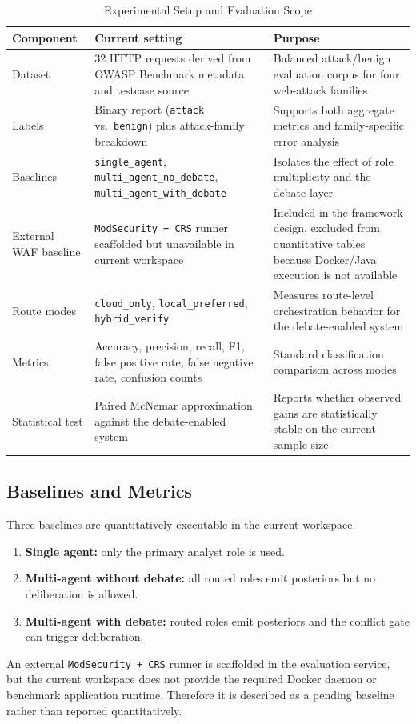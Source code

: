 \documentclass{ieeeaccess}
\begin{document}
\begin{table}[!t]
\caption{Experimental Setup and Evaluation Scope}
\label{tab:setup}
\centering
\small
\begin{tabularx}{\textwidth}{lYY}
\toprule
\textbf{Component} & \textbf{Current setting} & \textbf{Purpose} \\
\midrule
Dataset & 32 HTTP requests derived from OWASP Benchmark metadata and testcase source & Balanced attack/benign evaluation corpus for four web-attack families \\
Labels & Binary report (\texttt{attack} vs.\ \texttt{benign}) plus attack-family breakdown & Supports both aggregate metrics and family-specific error analysis \\
Baselines & \texttt{single\_agent}, \texttt{multi\_agent\_no\_debate}, \texttt{multi\_agent\_with\_debate} & Isolates the effect of role multiplicity and the debate layer \\
External WAF baseline & \texttt{ModSecurity + CRS} runner scaffolded but unavailable in current workspace & Included in the framework design, excluded from quantitative tables because Docker/Java execution is not available \\
Route modes & \texttt{cloud\_only}, \texttt{local\_preferred}, \texttt{hybrid\_verify} & Measures route-level orchestration behavior for the debate-enabled system \\
Metrics & Accuracy, precision, recall, F1, false positive rate, false negative rate, confusion counts & Standard classification comparison across modes \\
Statistical test & Paired McNemar approximation against the debate-enabled system & Reports whether observed gains are statistically stable on the current sample size \\
\bottomrule
\end{tabularx}
\end{table}

\subsection{Baselines and Metrics}
Three baselines are quantitatively executable in the current workspace.
\begin{enumerate}
\item \textbf{Single agent:} only the primary analyst role is used.
\item \textbf{Multi-agent without debate:} all routed roles emit posteriors but no deliberation is allowed.
\item \textbf{Multi-agent with debate:} routed roles emit posteriors and the conflict gate can trigger deliberation.
\end{enumerate}
An external \texttt{ModSecurity + CRS} runner is scaffolded in the evaluation service, but the current workspace does not provide the required Docker daemon or benchmark application runtime. Therefore it is described as a pending baseline rather than reported quantitatively.
\end{document}
